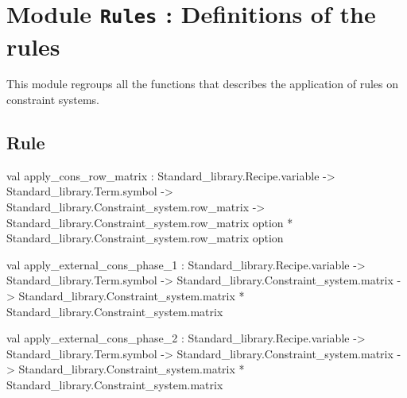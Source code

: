 \section{Module {\tt{Rules}} : Definitions of the rules}
\label{module:Rules}




\ocamldocvspace{0.5cm}



This module regroups all the functions that describes the application of rules on constraint systems.



\subsection{Rule \Cons  }




\label{val:Rules.apply-underscorecons-underscorerow-underscorematrix}\begin{ocamldoccode}
val apply_cons_row_matrix :
  Standard_library.Recipe.variable ->
  Standard_library.Term.symbol ->
  Standard_library.Constraint_system.row_matrix ->
  Standard_library.Constraint_system.row_matrix option *
  Standard_library.Constraint_system.row_matrix option
\end{ocamldoccode}




\label{val:Rules.apply-underscoreexternal-underscorecons-underscorephase-underscore1}\begin{ocamldoccode}
val apply_external_cons_phase_1 :
  Standard_library.Recipe.variable ->
  Standard_library.Term.symbol ->
  Standard_library.Constraint_system.matrix ->
  Standard_library.Constraint_system.matrix *
  Standard_library.Constraint_system.matrix
\end{ocamldoccode}




\label{val:Rules.apply-underscoreexternal-underscorecons-underscorephase-underscore2}\begin{ocamldoccode}
val apply_external_cons_phase_2 :
  Standard_library.Recipe.variable ->
  Standard_library.Term.symbol ->
  Standard_library.Constraint_system.matrix ->
  Standard_library.Constraint_system.matrix *
  Standard_library.Constraint_system.matrix
\end{ocamldoccode}




